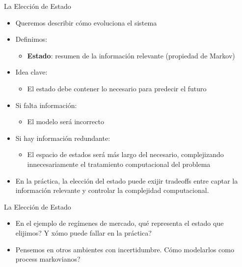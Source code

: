 \documentclass{beamer}
\begin{document}
\begin{frame}{La  Elecci\'on de Estado}
\begin{itemize}
\item Queremos describir cómo evoluciona el sistema

\item<2-> Definimos:
\begin{itemize}
\item \textbf{Estado}: resumen de la información relevante (propiedad de Markov)
\end{itemize}

\item<3-> Idea clave:
\begin{itemize}
\item El estado debe contener lo necesario para predecir el futuro
\end{itemize}

\item<4-> Si falta información:
\begin{itemize}
\item El modelo será incorrecto
\end{itemize}

\item<5-> Si hay informaci\'on redundante:
\begin{itemize}
\item El espacio de estados ser\'a m\'as largo del necesario, complejizando innecesariamente el tratamiento computacional del problema
\end{itemize}

\item<6-> En la pr\'actica, la elecci\'on del estado puede exijir tradeoffs entre captar la informaci\'on relevante y controlar la complejidad computacional.
\end{itemize}
\end{frame}

\begin{frame}{La  Elecci\'on de Estado}
\begin{itemize}
\item En el ejemplo de reg\'imenes de mercado, \textquestiondown qu\'e representa el estado que elijimos? Y \textquestiondown x\'omo puede fallar en la pr\'actica? 
\item<2-> Pensemos en otros ambientes con incertidumbre. \textquestiondown C\'omo modelarlos como process markovianos?
\end{itemize}
\end{frame}
\end{document}
